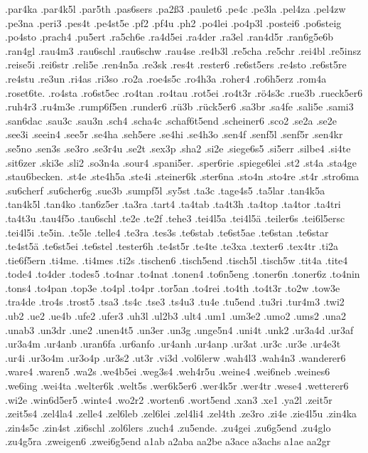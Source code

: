 {.par4ka
.par4k5l
.par5th
.pas6sers
.pa2ß3
.paulet6
.pe4c
.pe3la
.pel4za
.pel4zw
.pe3na
.peri3
.pes4t
.pe4st5e
.pf2
.pf4u
.ph2
.po4lei
.po4p3l
.postei6
.po6steig
.po4sto
.prach4
.pu5ert
.ra5ch6e
.ra4d5ei
.ra4der
.ra3el
.ran4d5r
.ran6g5e6b
.ran4gl
.rau4m3
.rau6schl
.rau6schw
.rau4se
.re4b3l
.re5cha
.re5chr
.rei4bl
.re5insz
.reise5i
.rei6str
.reli5e
.ren4n5a
.re3sk
.res4t
.rester6
.re6st5ers
.re4sto
.re6st5re
.re4stu
.re3un
.ri4as
.ri3so
.ro2a
.roe4s5c
.ro4h3a
.roher4
.ro6h5erz
.rom4a
.roset6te.
.ro4sta
.ro6st5ec
.ro4tan
.ro4tau
.rot5ei
.ro4t3r
.rö4s3c
.rue3b
.rueck5er6
.ruh4r3
.ru4m3e
.rump6f5en
.runder6
.rü3b
.rück5er6
.sa3br
.sa4fe
.sali5e
.sami3
.san6dac
.sau3c
.sau3n
.sch4
.scha4c
.schaf6t5end
.scheiner6
.sco2
.se2a
.se2e
.see3i
.seein4
.see5r
.se4ha
.seh5ere
.se4hi
.se4h3o
.sen4f
.senf5l
.senf5r
.sen4kr
.se5no
.sen3s
.se3ro
.se3r4u
.se2t
.sex3p
.sha2
.si2e
.siege6s5
.si5err
.silbe4
.si4te
.sit6zer
.ski3e
.sli2
.so3n4a
.sour4
.spani5er.
.sper6rie
.spiege6lei
.st2
.st4a
.sta4ge
.stau6becken.
.st4e
.ste4h5a
.ste4i
.steiner6k
.ster6na
.sto4n
.sto4re
.st4r
.stro6ma
.su6cherf
.su6cher6g
.sue3b
.sumpf5l
.sy5st
.ta3c
.tage4s5
.ta5lar
.tan4k5a
.tan4k5l
.tan4ko
.tan6z5er
.ta3ra
.tart4
.ta4tab
.ta4t3h
.ta4top
.ta4tor
.ta4tri
.ta4t3u
.tau4f5o
.tau6schl
.te2e
.te2f
.tehe3
.tei4l5a
.tei4l5ä
.teiler6s
.tei6l5ersc
.tei4l5i
.te5in.
.te5le
.telle4
.te3ra
.tes3s
.te6stab
.te6st5ae
.te6stan
.te6star
.te4st5ä
.te6st5ei
.te6stel
.tester6h
.te4st5r
.te4te
.te3xa
.texter6
.tex4tr
.ti2a
.tie6f5ern
.ti4me.
.ti4mes
.ti2s
.tischen6
.tisch5end
.tisch5l
.tisch5w
.tit4a
.tite4
.tode4
.to4der
.todes5
.to4nar
.to4nat
.tonen4
.to6n5eng
.toner6n
.toner6z
.to4nin
.tons4
.to4pan
.top3e
.to4pl
.to4pr
.tor5an
.to4rei
.to4th
.to4t3r
.to2w
.tow3e
.tra4de
.tro4s
.trost5
.tsa3
.ts4c
.tse3
.ts4u3
.tu4e
.tu5end
.tu3ri
.tur4m3
.twi2
.ub2
.ue2
.ue4b
.ufe2
.ufer3
.uh3l
.ul2b3
.ult4
.um1
.um3e2
.umo2
.ums2
.una2
.unab3
.un3dr
.une2
.unen4t5
.un3er
.un3g
.unge5n4
.uni4t
.unk2
.ur3a4d
.ur3af
.ur3a4m
.ur4anb
.uran6fa
.ur6anfo
.ur4anh
.ur4anp
.ur3at
.ur3c
.ur3e
.ur4e3t
.ur4i
.ur3o4m
.ur3o4p
.ur3s2
.ut3r
.vi3d
.vol6lerw
.wah4l3
.wah4n3
.wanderer6
.ware4
.waren5
.wa2s
.we4b5ei
.weg3s4
.weh4r5u
.weine4
.wei6neb
.weines6
.we6ing
.wei4ta
.welter6k
.welt5s
.wer6k5er6
.wer4k5r
.wer4tr
.wese4
.wetterer6
.wi2e
.win6d5er5
.winte4
.wo2r2
.worten6
.wort5end
.xan3
.xe1
.ya2l
.zeit5r
.zeit5s4
.zel4la4
.zelle4
.zel6leb
.zel6lei
.zel4li4
.zel4th
.ze3ro
.zi4e
.zie4l5u
.zin4ka
.zin4s5c
.zin4st
.zi6schl
.zol6lers
.zuch4
.zu5ende.
.zu4gei
.zu6g5end
.zu4glo
.zu4g5ra
.zweigen6
.zwei6g5end
a1ab
a2aba
aa2be
a3ace
a3achs
a1ae
aa2gr
}
